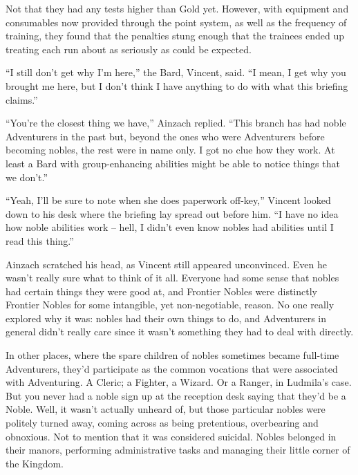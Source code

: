 Not that they had any tests higher than Gold yet. However, with equipment and consumables now provided through the point system, as well as the frequency of training, they found that the penalties stung enough that the trainees ended up treating each run about as seriously as could be expected.

 

“I still don’t get why I’m here,” the Bard, Vincent, said. “I mean, I get why you brought me here, but I don’t think I have anything to do with what this briefing claims.”

 

“You’re the closest thing we have,” Ainzach replied. “This branch has had noble Adventurers in the past but, beyond the ones who were Adventurers before becoming nobles, the rest were in name only. I got no clue how they work. At least a Bard with group-enhancing abilities might be able to notice things that we don’t.”

 

“Yeah, I’ll be sure to note when she does paperwork off-key,” Vincent looked down to his desk where the briefing lay spread out before him. “I have no idea how noble abilities work – hell, I didn’t even know nobles had abilities until I read this thing.”

 

Ainzach scratched his head, as Vincent still appeared unconvinced. Even he wasn’t really sure what to think of it all. Everyone had some sense that nobles had certain things they were good at, and Frontier Nobles were distinctly Frontier Nobles for some intangible, yet non-negotiable, reason. No one really explored why it was: nobles had their own things to do, and Adventurers in general didn’t really care since it wasn’t something they had to deal with directly.

 

In other places, where the spare children of nobles sometimes became full-time Adventurers, they’d participate as the common vocations that were associated with Adventuring. A Cleric; a Fighter, a Wizard. Or a Ranger, in Ludmila’s case. But you never had a noble sign up at the reception desk saying that they’d be a Noble. Well, it wasn’t actually unheard of, but those particular nobles were politely turned away, coming across as being pretentious, overbearing and obnoxious. Not to mention that it was considered suicidal. Nobles belonged in their manors, performing administrative tasks and managing their little corner of the Kingdom.

